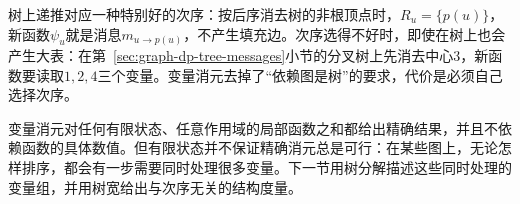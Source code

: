 树上递推对应一种特别好的次序：按后序消去树的非根顶点时，$R_u=\{p(u)\}$，新函数$\psi_u$就是消息$m_{u\to p(u)}$，不产生填充边。次序选得不好时，即使在树上也会产生大表：在第~\ref{sec:graph-dp-tree-messages}小节的分叉树上先消去中心$3$，新函数要读取$1,2,4$三个变量。变量消元去掉了“依赖图是树”的要求，代价是必须自己选择次序。

变量消元对任何有限状态、任意作用域的局部函数之和都给出精确结果，并且不依赖函数的具体数值。但有限状态并不保证精确消元总是可行：在某些图上，无论怎样排序，都会有一步需要同时处理很多变量。下一节用树分解描述这些同时处理的变量组，并用树宽给出与次序无关的结构度量。
